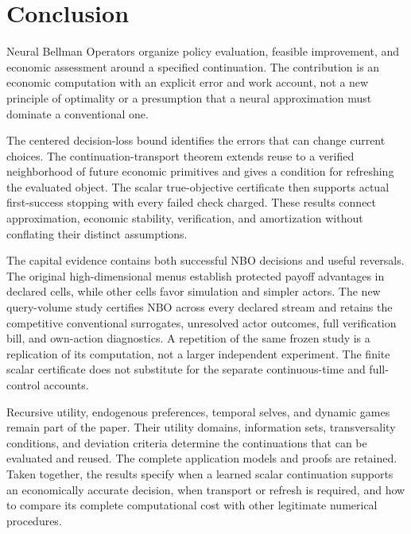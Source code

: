 \section{Conclusion}\label{sec:conclusion}
Neural Bellman Operators organize policy evaluation, feasible improvement,
and economic assessment around a specified continuation. The contribution
is an economic computation with an explicit error and work account, not a
new principle of optimality or a presumption that a neural approximation
must dominate a conventional one.

The centered decision-loss bound identifies the errors that can change
current choices. The continuation-transport theorem extends reuse to a
verified neighborhood of future economic primitives and gives a condition
for refreshing the evaluated object. The scalar true-objective certificate
then supports actual first-success stopping with every failed check charged.
These results connect approximation, economic stability, verification, and
amortization without conflating their distinct assumptions.

The capital evidence contains both successful NBO decisions and useful
reversals. The original high-dimensional menus establish protected payoff
advantages in declared cells, while other cells favor simulation and simpler
actors. The new query-volume study certifies NBO across every declared
stream and retains the competitive conventional surrogates, unresolved actor
outcomes, full verification bill, and own-action diagnostics. A repetition
of the same frozen study is a replication of its computation, not a larger
independent experiment. The finite scalar certificate does not substitute
for the separate continuous-time and full-control accounts.

Recursive utility, endogenous preferences, temporal selves, and dynamic
games remain part of the paper. Their utility domains, information sets,
transversality conditions, and deviation criteria determine the continuations
that can be evaluated and reused. The complete application models and proofs
are retained. Taken together, the results specify when a learned scalar
continuation supports an economically accurate decision, when transport or
refresh is required, and how to compare its complete computational cost with
other legitimate numerical procedures.
